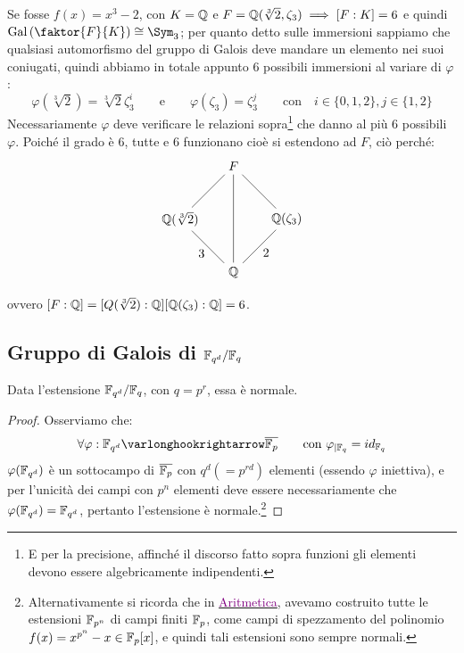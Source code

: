 \documentclass[11pt]{scrartcl}
\begin{document}
\begin{example}
    Se fosse $f(x) = x^3 - 2$, con $K = \mathbb Q$ e $F = \mathbb Q(\sqrt[3]{2},\zeta_3) \implies [F : K] = 6$ e quindi $\Gal\left(\faktor{F}{K}\right) \cong \Sym_3$; per quanto detto sulle immersioni sappiamo che qualsiasi automorfismo del gruppo di Galois 
    deve mandare un elemento nei suoi coniugati, quindi abbiamo in totale appunto 6 possibili immersioni al variare di $\varphi$:
    \[ \varphi(\sqrt[3]{2}) = \sqrt[3]{2}\zeta_3^i \qquad \text{e} \qquad \varphi(\zeta_3) = \zeta_3^j \qquad \text{con}\quad i \in \{0,1,2\},j \in \{1,2\}
        \]
    Necessariamente $\varphi$ deve verificare le relazioni sopra\footnote{E per la precisione, affinché il discorso fatto sopra funzioni gli elementi devono essere algebricamente indipendenti.} che
    danno al più 6 possibili $\varphi$. Poiché il grado è 6, tutte e 6 funzionano cioè si estendono ad $F$, ciò perché:
    \[ \begin{tikzpicture}
        \node (Q1) at (0,0) {$\QQ$};
        \node (Q2) at (1.5,1.5) {$\QQ(\zeta_3)$};
        \node (Q3) at (0,3) {$F$};
        \node (Q4) at (-1.5,1.5) {$\QQ(\sqrt[3]2)$};
        \draw (Q1)--(Q2) node [pos=0.7, below,inner sep=0.25cm] {2};
        \draw (Q1)--(Q4) node [pos=0.7, below,inner sep=0.25cm] {3};
        \draw (Q3)--(Q4) node [pos=0.7, above]{};
        \draw (Q2)--(Q3) node [pos=0.3, above]{};
        \draw (Q1)--(Q3) node [pos=0.7, below, right,inner sep=0.25cm, yshift=-0.4cm]{};
        \end{tikzpicture}
    \]
    ovvero $[F : \mathbb Q] = [Q (\sqrt[3]{2}) : \mathbb Q][\mathbb Q(\zeta_3) : \mathbb Q] = 6$.
\end{example}

\newpage
\subsection{Gruppo di Galois di $\F{q^d}/\F{q}$}

\begin{proposition}[L'estensione $\F{q^d}/\F{q}$]
    Data l'estensione $\F{q^d}/\F{q}$, con $q = p^r$, essa è normale.
\end{proposition}

\begin{proof}
    Osserviamo che:
    \[ \forall \varphi : \F{q^d} \varlonghookrightarrow \overline \Fp \qquad \text{con $\varphi_{|\F{q}} = id_{\F{q}}$}
        \]
    $\varphi(\mathbb{F}_{q^d})$ è un sottocampo di $\overline{{\mathbb F}_p}$ con $q^d (= p^{rd})$ elementi (essendo $\varphi$ iniettiva), e per l'unicità dei campi con $p^n$ elementi deve essere necessariamente che $\varphi(\mathbb{F}_{q^d}) = \mathbb{F}_{q^d}$,
    pertanto l'estensione è normale.\footnote{Alternativamente si ricorda che in \href{https://github.com/diego-unipi/Appunti-Aritmetica}{\textcolor{purple}{Aritmetica}}, avevamo costruito tutte le estensioni $\mathbb{F}_{p^{n}}$ di campi finiti ${\mathbb F}_p$, come campi di spezzamento del polinomio $f(x) = x^{p^n} - x \in {\mathbb F}_p[x]$, e quindi tali estensioni sono sempre normali.}
\end{proof}
\end{document}
